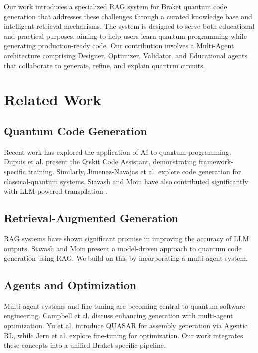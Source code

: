 \documentclass[runningheads]{llncs}
\begin{document}
Our work introduces a specialized RAG system for Braket quantum code generation that addresses these challenges through a curated knowledge base and intelligent retrieval mechanisms. The system is designed to serve both educational and practical purposes, aiming to help users learn quantum programming while generating production-ready code. Our contribution involves a Multi-Agent architecture comprising Designer, Optimizer, Validator, and Educational agents that collaborate to generate, refine, and explain quantum circuits.

\section{Related Work}

\subsection{Quantum Code Generation}
Recent work has explored the application of AI to quantum programming. Dupuis et al. \cite{10691762} present the Qiskit Code Assistant, demonstrating framework-specific training. Similarly, Jimenez-Navajas et al. \cite{jimenez2025codegeneration} explore code generation for classical-quantum systems. Siavash and Moin have also contributed significantly with LLM-powered transpilation \cite{siavash2025llmpoweredquantumcodetranspilation}.

\subsection{Retrieval-Augmented Generation}
RAG systems have shown significant promise in improving the accuracy of LLM outputs. Siavash and Moin \cite{siavash2025modeldrivenquantumcodegeneration} present a model-driven approach to quantum code generation using RAG. We build on this by incorporating a multi-agent system.

\subsection{Agents and Optimization}
Multi-agent systems and fine-tuning are becoming central to quantum software engineering. Campbell et al. \cite{campbell2025enhancingllmbasedquantumcode} discuss enhancing generation with multi-agent optimization. Yu et al. \cite{yu2025quasarquantumassemblycode} introduce QUASAR for assembly generation via Agentic RL, while Jern et al. \cite{jern2025agentqfinetuninglargelanguage} explore fine-tuning for optimization. Our work integrates these concepts into a unified Braket-specific pipeline.
\end{document}
